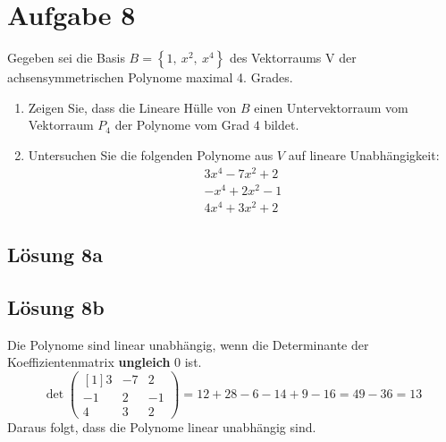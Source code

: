 \documentclass[main.tex]{subfiles}
\begin{document}
\section{Aufgabe 8}
Gegeben sei die Basis $B=\left\{1,\ x^{2} ,\ x^{4}\right\}$ des Vektorraums V der achsensymmetrischen Polynome maximal 4. Grades. 

\begin{enumerate}
    \item Zeigen Sie, dass die Lineare Hülle von $B$ einen Untervektorraum vom Vektorraum $P_{4}$ der Polynome vom Grad $4$ bildet.
    \item Untersuchen Sie die folgenden Polynome aus $V$ auf lineare Unabhängigkeit:
    \begin{gather*}
        3x^{4} -7x^{2} +2\\
        -x^{4} +2x^{2} -1\\
        4x^{4} +3x^{2} +2
    \end{gather*}    
\end{enumerate}

\subsection{Lösung 8a}

\subsection{Lösung 8b}

Die Polynome sind linear unabhängig, wenn die Determinante der Koeffizientenmatrix \textbf{ungleich} $0$ ist.
\begin{equation*}
    \det\begin{pmatrix}[1]
    3 & -7 & 2\\
    -1 & 2 & -1\\
    4 & 3 & 2
    \end{pmatrix} = 12+28-6-14+9-16 = 49-36 = 13
\end{equation*}
Daraus folgt, dass die Polynome linear unabhängig sind.
\end{document}
